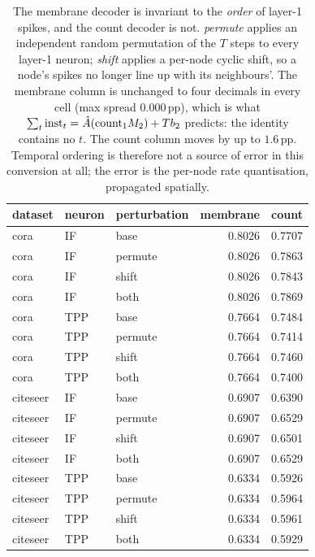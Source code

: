 \begin{table}[t]
\centering
\footnotesize
\caption{The membrane decoder is invariant to the \emph{order} of layer-1 spikes, and the count
decoder is not. \emph{permute} applies an independent random permutation of the $T$ steps to
every layer-1 neuron; \emph{shift} applies a per-node cyclic shift, so a node's spikes no longer
line up with its neighbours'. The membrane column is unchanged to four decimals in every cell
(max spread 0.000\,pp), which is what
$\sum_t\mathrm{inst}_t=\hat{A}(\mathrm{count}_1M_2)+Tb_2$ predicts: the identity contains no $t$.
The count column moves by up to $1.6$\,pp. Temporal ordering is therefore not a source of error
in this conversion at all; the error is the per-node rate quantisation, propagated spatially.}
\label{tab:order}
\begin{tabular}{lllrr}
\toprule
dataset & neuron & perturbation & membrane & count \\
\midrule
cora & IF & base & 0.8026 & 0.7707 \\
cora & IF & permute & 0.8026 & 0.7863 \\
cora & IF & shift & 0.8026 & 0.7843 \\
cora & IF & both & 0.8026 & 0.7869 \\
cora & TPP & base & 0.7664 & 0.7484 \\
cora & TPP & permute & 0.7664 & 0.7414 \\
cora & TPP & shift & 0.7664 & 0.7460 \\
cora & TPP & both & 0.7664 & 0.7400 \\
citeseer & IF & base & 0.6907 & 0.6390 \\
citeseer & IF & permute & 0.6907 & 0.6529 \\
citeseer & IF & shift & 0.6907 & 0.6501 \\
citeseer & IF & both & 0.6907 & 0.6529 \\
citeseer & TPP & base & 0.6334 & 0.5926 \\
citeseer & TPP & permute & 0.6334 & 0.5964 \\
citeseer & TPP & shift & 0.6334 & 0.5961 \\
citeseer & TPP & both & 0.6334 & 0.5929 \\
\bottomrule
\end{tabular}
\end{table}
